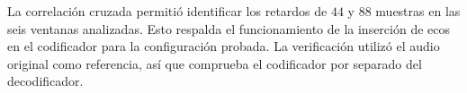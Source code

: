 La correlación cruzada permitió identificar los retardos de $44$ y $88$ muestras en las seis ventanas analizadas. Esto respalda el funcionamiento de la inserción de ecos en el codificador para la configuración probada. La verificación utilizó el audio original como referencia, así que comprueba el codificador por separado del decodificador.

